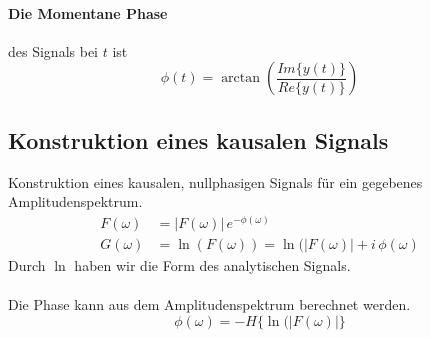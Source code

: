 \paragraph{Die Momentane Phase} des Signals bei $t$ ist
\[
\phi(t) = \arctan\left( \frac{Im\{y(t)\}}{Re\{y(t)\}} \right)
\]
\subsection{Konstruktion eines kausalen Signals}
Konstruktion eines kausalen, nullphasigen Signals für ein gegebenes Amplitudenspektrum.
\[
\begin{split}
F(\omega) & = |F(\omega)|\, e^{-\phi(\omega)}\\
G(\omega) & = \ln(F(\omega)) = \ln(|F(\omega)| + i\,\phi(\omega)
\end{split}
\]
Durch $\ln$ haben wir die Form des analytischen Signals.\\\\
Die Phase kann aus dem Amplitudenspektrum berechnet werden.
\[
\phi(\omega) = -H\{\ln(|F(\omega)|\}
\]